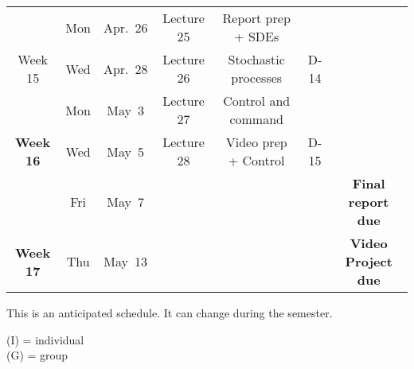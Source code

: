 \documentclass[12pt]{article}
\begin{document}
{\begin{tabular}{ccccccc}
  \hline
         & Mon & Apr.~26   & Lecture 25  &  Report prep + SDEs&  & \\
  Week 15     & Wed & Apr.~28  &   Lecture 26  & Stochastic processes  & D-14 &  \\
    \hline
         & Mon & May~3   &  Lecture 27 & Control and command   &  &\\
  \textbf{Week 16 }    & Wed & May~5  &   Lecture 28  & Video prep  +  Control & D-15  &\\
          & Fri & May~7   & & & & \textbf{ Final report due }\\
  \hline
    \textbf{Week 17 }        & Thu & May~13 &  & &   & {\bf Video Project due}\\
  \hline
\end{tabular}

}
\begin{center}
This is an anticipated schedule. It can change during the semester.\\
\end{center}
(I) = individual\\
(G) = group\\
\end{document}

